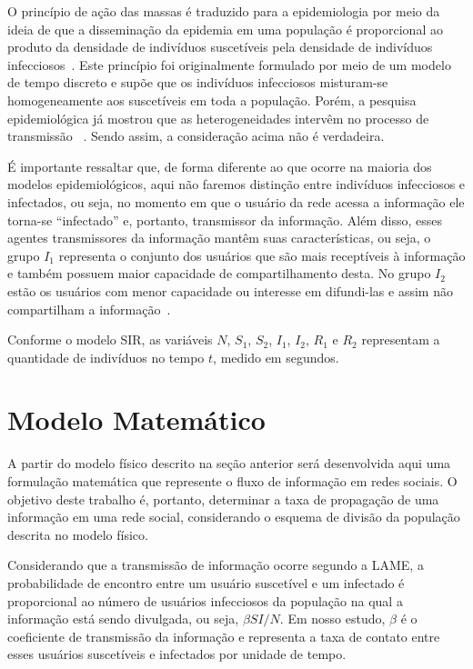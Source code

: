 \documentclass[
	12pt,				%
	openright,			%
	oneside,			%
	a4paper,			%
	english,			%
	french,				%
	spanish,			%
	brazil				%
	]{abntex2}
\begin{document}
O princípio de ação das massas é traduzido para a epidemiologia por
meio da ideia de que a disseminação da epidemia em uma população é
proporcional ao produto da densidade de indivíduos suscetíveis pela
densidade de indivíduos infecciosos~\cite{massad1996}. Este princípio
foi originalmente formulado por meio de um modelo de tempo discreto e
supõe que os indivíduos infecciosos misturam-se homogeneamente aos
suscetíveis em toda a população. Porém, a pesquisa epidemiológica já
mostrou que as heterogeneidades intervêm no processo de transmissão
~\cite{coutinho2004}. Sendo assim, a consideração acima não é
verdadeira.

É importante ressaltar que, de forma diferente ao que ocorre na
maioria dos modelos epidemiológicos, aqui não faremos distinção entre
indivíduos infecciosos e infectados, ou seja, no momento em que o
usuário da rede acessa a informação ele torna-se ``infectado'' e,
portanto, transmissor da informação. Além disso, esses agentes
transmissores da informação mantêm suas características, ou seja, o
grupo $I_1$ representa o conjunto dos usuários que são mais
receptíveis à informação e também possuem maior capacidade de
compartilhamento desta. No grupo $I_2$ estão os usuários com menor
capacidade ou interesse em difundi-las e assim não compartilham a
informação~\cite{pachi2006}.

Conforme o modelo SIR, as variáveis $N$, $S_1$, $S_2$, $I_1$, $I_2$,
$R_1$ e $R_2$ representam a quantidade de indivíduos no tempo $t$,
medido em segundos.


\chapter{Modelo Matemático}
A partir do modelo físico descrito na seção anterior será desenvolvida
aqui uma formulação matemática que represente o fluxo de informação em
redes sociais. O objetivo deste trabalho é, portanto, determinar a
taxa de propagação de uma informação em uma rede social, considerando
o esquema de divisão da população descrita no modelo físico.

Considerando que a transmissão de informação ocorre segundo a LAME, a
probabilidade de encontro entre um usuário suscetível e um infectado é
proporcional ao número de usuários infecciosos da população na qual a
informação está sendo divulgada, ou seja, $\beta SI / N$. Em nosso
estudo, $\beta$ é o coeficiente de transmissão da informação e
representa a taxa de contato entre esses usuários suscetíveis e
infectados por unidade de tempo.
\end{document}
